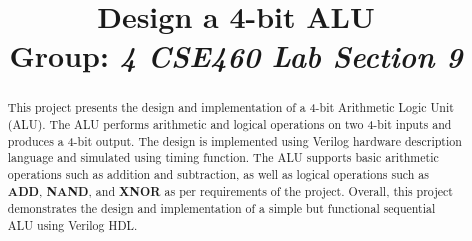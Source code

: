 \documentclass[conference]{IEEEtran}
\begin{document}
    \title{Design a 4-bit ALU\\
    {\footnotesize Group: \textit{4 CSE460 Lab Section 9}}
    }

    \author{
    \and

    \and

    \and

    \and

    }

    \maketitle

    \begin{abstract}
        This project presents the design and implementation of a 4-bit Arithmetic Logic Unit (ALU).
        The ALU performs arithmetic and logical operations on two 4-bit inputs and produces a 4-bit output.
        The design is implemented using Verilog hardware description language and simulated using timing function.
        The ALU supports basic arithmetic operations such as addition and subtraction,
        as well as logical operations such as \textbf{ADD}, \textbf{NAND}, and \textbf{XNOR}
        as per requirements of the project.
        Overall, this project demonstrates the design and implementation of a simple but
        functional sequential ALU using Verilog HDL.
    \end{abstract}
\end{document}
